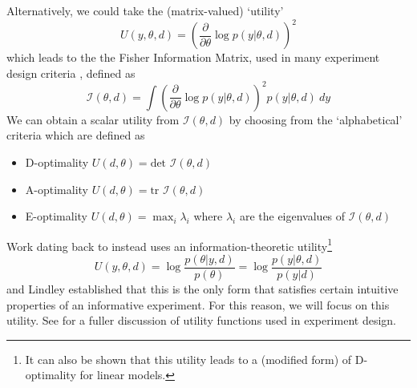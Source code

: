 Alternatively, we could take the (matrix-valued) `utility'
\begin{equation}
	U(y, \theta, d) = \left( \frac{\partial}{\partial \theta} \log p(y | \theta, d) \right)^2
\end{equation}
which leads to the the Fisher Information Matrix, used in many experiment design criteria \cite{pronzato2010}, defined as
\begin{equation}
	\mathcal{I}(\theta, d) = \int \left( \frac{\partial}{\partial \theta} \log p(y | \theta, d) \right)^2 p(y | \theta, d)\ dy
\end{equation}
We can obtain a scalar utility from $\mathcal{I}(\theta, d)$ by choosing from the `alphabetical' criteria \cite{box1982} which are defined as
\begin{itemize}
	\item D-optimality $U(d, \theta) = \text{det } \mathcal{I}(\theta, d)$
	\item A-optimality $U(d, \theta) = \text{tr } \mathcal{I}(\theta, d)$
	\item E-optimality $U(d, \theta) = \max_i \lambda_i$ where $\lambda_i$ are the eigenvalues of $\mathcal{I}(\theta, d)$
\end{itemize}

Work dating back to \cite{lindley1956} instead uses an information-theoretic utility\footnote{It can also be shown \cite{chaloner1995} that this utility leads to a (modified form) of D-optimality for linear models.}
\begin{equation}
	U(y, \theta, d) = \log \frac{p(\theta | y, d)}{p(\theta)} = \log \frac{p(y | \theta, d)}{p(y|d)}
\end{equation}
and Lindley established that this is the only form that satisfies certain intuitive properties of an informative experiment. For this reason, we will focus on this utility. See \cite{chaloner1995, ryan2015} for a fuller discussion of utility functions used in experiment design.

